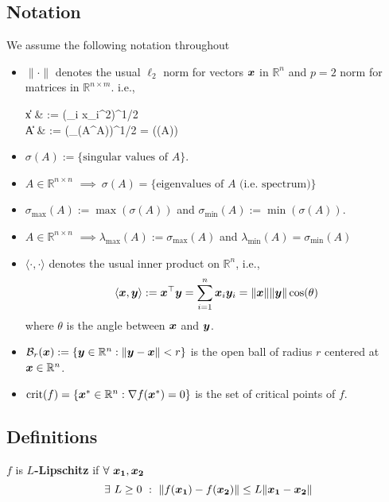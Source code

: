 \documentclass[10pt]{article}
\begin{document}
\subsection*{Notation}
    We assume the following notation throughout\
    \begin{itemize}
        \label{notation}
        \item $\| \cdot \|$ denotes the usual $\ell_2$ norm for vectors $\bm{x}$ in $\mathbb{R}^n$ and $p = 2$ norm
        for matrices in $\mathbb{R}^{n \times m}$. i.e.,
        \begin{flalign*}
            \|x\| & := \left(\sum_i x_i^2\right)^{1/2} \\
                \|A\| & := (\lambda_{\max}(A^\top A))^{1/2}
        = \max(\sigma(A))
        \end{flalign*}
        \item $\sigma(A) := \{\text{singular values of } A\}$.
        \item $A \in \mathbb{R}^{n\times n}$ $\implies ~ \sigma(A) = \{\text{eigenvalues of } A \text{ (i.e. spectrum)}\}$
        \item $\sigma_{\max}(A) := \max(\sigma(A))$ and $\sigma_{\min}(A) := \min(\sigma(A))$.
        \item $ A \in \mathbb{R}^{n\times n}$  $\implies \lambda_{\max}(A) := \sigma_{\max}(A)$ and $\lambda_{\min}(A) = \sigma_{\min}(A) $
        \item $\langle \cdot, \cdot \rangle$ denotes the usual inner product on $\mathbb{R}^n$, i.e.,
        $$
            \langle \bm{x}, \bm{y} \rangle := \bm{x}^\top \bm{y} = \sum_{i=1}^n \bm{x}_i \bm{y}_i = \| \bm{x} \| \|\bm{y}\| \cos(\theta)
        $$
        where $\theta$ is the angle between $\bm{x}$ and $\bm{y}$.
        \item $\mathcal{B}_r(\bm{x}) := \{ \bm{y} \in \mathbb{R}^n : \|\bm{y} - \bm{x}\| < r \}$ is the open ball of 
        radius $r$ centered at $\bm{x} \in \mathbb{R}^n$.
        \item $\text{crit}(f) = \{ \bm{x}^* \in \mathbb{R}^n : \nabla f(\bm{x}^*) = 0 \}$ is the set of critical points of $f$.
    \end{itemize}


\subsection*{Definitions}
    \label{sec:definitions}
    
    \begin{definition}
        $f$ is \textbf{$L$-Lipschitz} if $\forall ~ \bm{x_1},\bm{x_2}$
        $$
        \; \exists~ L \geq 0 ~:~  \| f(\bm{x_1}) - f(\bm{x_2})\| 
        \leq L\|\bm{x_1} - \bm{x_2}\|
        $$
    \end{definition}
\end{document}
